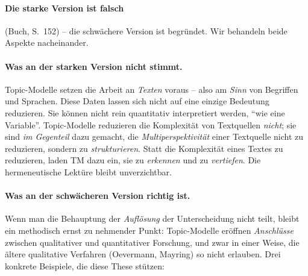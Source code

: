 \documentclass[a4paper,11pt]{article}
\begin{document}
\paragraph{Die starke Version ist falsch} (Buch, S.~152) -- die
schwächere Version ist begründet. Wir behandeln beide Aspekte
nacheinander.

\paragraph{Was an der starken Version nicht stimmt.} Topic-Modelle
setzen die Arbeit an \emph{Texten} voraus -- also am \emph{Sinn} von
Begriffen und Sprachen. Diese Daten lassen sich nicht auf eine
einzige Bedeutung reduzieren. Sie können nicht rein quantitativ
interpretiert werden, \enquote{wie eine Variable}. Topic-Modelle
reduzieren die Komplexität von Textquellen \emph{nicht}; sie sind
\emph{im Gegenteil} dazu gemacht, die \emph{Multiperspektivität} einer
Textquelle nicht zu reduzieren, sondern zu \emph{strukturieren}. Statt
die Komplexität eines Textes zu reduzieren, laden TM dazu ein, sie zu
\emph{erkennen} und zu \emph{vertiefen}. Die hermeneutische Lektüre
bleibt unverzichtbar.

\paragraph{Was an der schwächeren Version richtig ist.} Wenn man die
Behauptung der \emph{Auflösung} der Unterscheidung nicht teilt, bleibt
ein methodisch ernst zu nehmender Punkt: Topic-Modelle eröffnen
\emph{Anschlüsse} zwischen qualitativer und quantitativer Forschung,
und zwar in einer Weise, die ältere qualitative Verfahren (Oevermann,
Mayring) so nicht erlauben. Drei konkrete Beispiele, die diese These
stützen:
\end{document}
